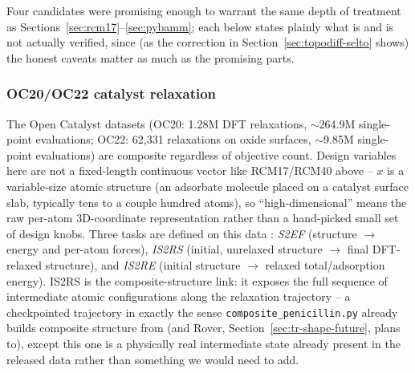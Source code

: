 \documentclass[11pt]{article}
\begin{document}
Four candidates were promising enough to warrant the same depth of
treatment as Sections~\ref{sec:rcm17}--\ref{sec:pybamm}; each below states
plainly what is and is not actually verified, since (as the correction in
Section~\ref{sec:topodiff-selto} shows) the honest caveats matter as much
as the promising parts.

\subsubsection{OC20/OC22 catalyst relaxation}
\label{sec:oc20}

The Open Catalyst datasets \citep{chanussot2021oc20,tran2022oc22} (OC20:
1.28M DFT relaxations, $\sim$264.9M single-point evaluations; OC22: 62,331
relaxations on oxide surfaces, $\sim$9.85M single-point evaluations) are
composite regardless of objective count. Design variables here are not a
fixed-length continuous vector like RCM17/RCM40 above -- $x$ is a
variable-size atomic structure (an adsorbate molecule placed on a
catalyst surface slab, typically tens to a couple hundred atoms), so
``high-dimensional'' means the raw per-atom 3D-coordinate representation
rather than a hand-picked small set of design knobs. Three tasks are
defined on this data \citep{chanussot2021oc20}: \emph{S2EF} (structure
$\to$ energy and per-atom forces), \emph{IS2RS} (initial, unrelaxed
structure $\to$ final DFT-relaxed structure), and \emph{IS2RE} (initial
structure $\to$ relaxed total/adsorption energy). IS2RS is the
composite-structure link: it exposes the full sequence of intermediate
atomic configurations along the relaxation trajectory -- a checkpointed
trajectory in exactly the sense \texttt{composite\_penicillin.py} already
builds composite structure from (and Rover, Section~\ref{sec:tr-shape-future},
plans to), except this one is a physically real intermediate state
already present in the released data rather than something we would need
to add.
\end{document}
